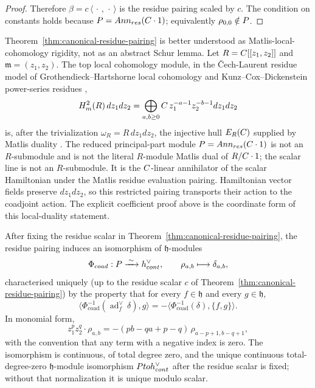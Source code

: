 \documentclass[11pt]{memoir}
\begin{document}
\begin{proof}
  Therefore $\beta=c\,\langle\,\cdot\,,\,\cdot\,\rangle$ is the residue
  pairing scaled by $c$. The condition on constants holds because
  $P=Ann_{res}(C\cdot1)$; equivalently
  $\rho_{0,0}\notin P$.
\end{proof}

\begin{rmk}\label{rmk:residue-pairing-schur}
  Theorem~\ref{thm:canonical-residue-pairing} is better understood as
  Matlis-local-cohomology rigidity, not as an abstract Schur lemma. Let
  $R=C[[z_1,z_2]]$ and $\mathfrak m=(z_1,z_2)$. The top local
  cohomology module, in the \v{C}ech-Laurent residue model of
  Grothendieck--Hartshorne local cohomology and
  Kunz--Cox--Dickenstein power-series residues
  \cites{hartshorne-local-cohomology,kunz-residues-duality},
  $$H^2_{m}(R)\,dz_1dz_2
    =\bigoplus_{a,b\geq0}C\,z_1^{-a-1}z_2^{-b-1}dz_1dz_2$$
  is, after the trivialization $\omega_R=R\,dz_1dz_2$, the injective
  hull $E_R(C)$ supplied by Matlis duality
  \cite{matlis-injective}. The reduced principal-part module
  $P=Ann_{res}(C\cdot1)$ is not an $R$-submodule and is
  not the literal $R$-module Matlis dual of $R/C\cdot1$; the scalar
  line is not an $R$-submodule. It is the $C$-linear annihilator of
  the scalar Hamiltonian under the Matlis residue evaluation pairing.
  Hamiltonian vector fields preserve $dz_1dz_2$, so this restricted
  pairing transports their action to the coadjoint action. The explicit
  coefficient proof above is the coordinate form of this local-duality
  statement.
\end{rmk}

\begin{thm}\label{thm:principal-part-coadjoint-uniqueness}
  After fixing the residue scalar in
  Theorem~\ref{thm:canonical-residue-pairing}, the residue pairing induces
  an isomorphism of $\mathfrak h$-modules
  $$\Phi_{coad}:P\xrightarrow{\;\sim\;}
    h^\vee_{cont},\qquad
    \rho_{a,b}\longmapsto\delta_{a,b},$$
  characterised uniquely (up to the residue scalar $c$ of
  Theorem~\ref{thm:canonical-residue-pairing}) by the property that for
  every $f\in\mathfrak h$ and every $g\in\mathfrak h$,
  $$\langle\Phi_{\mathrm{coad}}^{-1}(\operatorname{ad}^{\vee}_f\,\delta),g\rangle
   =-\langle\Phi_{\mathrm{coad}}^{-1}(\delta),\{f,g\}\rangle.$$
  In monomial form,
  $$z_1^pz_2^q\cdot\rho_{a,b}
    =-(pb-qa+p-q)\,\rho_{a-p+1,b-q+1},$$
  with the convention that any term with a negative index is zero. The
  isomorphism is continuous, of total degree zero, and the unique
  continuous total-degree-zero $\mathfrak h$-module isomorphism
  $Ptoh^\vee_{cont}$ after the residue scalar is
  fixed; without that normalization it is unique modulo scalar.
\end{thm}
\end{document}
